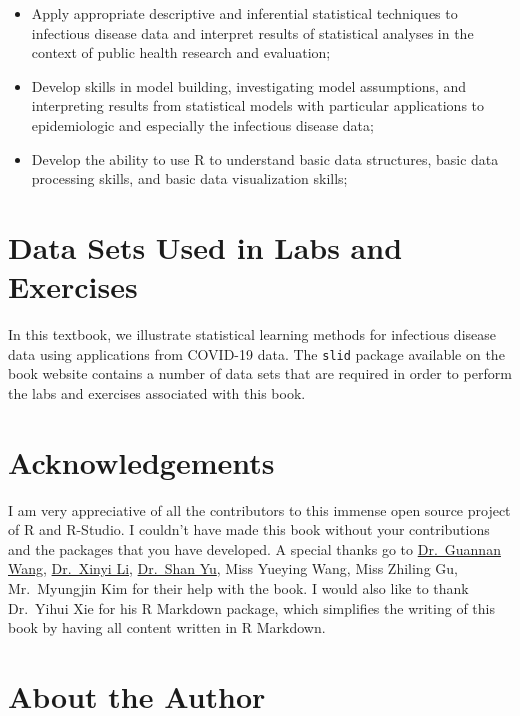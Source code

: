 \documentclass[]{book}
\providecommand{\tightlist}{%
  \setlength{\itemsep}{0pt}\setlength{\parskip}{0pt}}
\begin{document}
\begin{itemize}
\tightlist
\item
  Apply appropriate descriptive and inferential statistical techniques
  to infectious disease data and interpret results of statistical
  analyses in the context of public health research and evaluation;
\item
  Develop skills in model building, investigating model assumptions, and
  interpreting results from statistical models with particular
  applications to epidemiologic and especially the infectious disease
  data;
\item
  Develop the ability to use R to understand basic data structures,
  basic data processing skills, and basic data visualization skills;
\end{itemize}

\section{Data Sets Used in Labs and
Exercises}\label{data-sets-used-in-labs-and-exercises}

In this textbook, we illustrate statistical learning methods for
infectious disease data using applications from COVID-19 data. The
\texttt{slid} package available on the book website contains a number of
data sets that are required in order to perform the labs and exercises
associated with this book.

\section{Acknowledgements}\label{acknowledgements}

I am very appreciative of all the contributors to this immense open
source project of R and R-Studio. I couldn't have made this book without
your contributions and the packages that you have developed. A special
thanks go to
\href{https://people.wm.edu/~gwang01/index.html}{Dr.~Guannan Wang},
\href{https://mthsc.clemson.edu/directory/view_person.py?person_id=734}{Dr.~Xinyi
Li},
\href{https://statistics.as.virginia.edu/faculty-staff/profile/sy5jx}{Dr.~Shan
Yu}, Miss Yueying Wang, Miss Zhiling Gu, Mr.~Myungjin Kim for their help
with the book. I would also like to thank Dr.~Yihui Xie
\citep{xie2020bookdown} for his R Markdown package, which simplifies the
writing of this book by having all content written in R Markdown.

\section{About the Author}\label{about-the-author}
\end{document}
